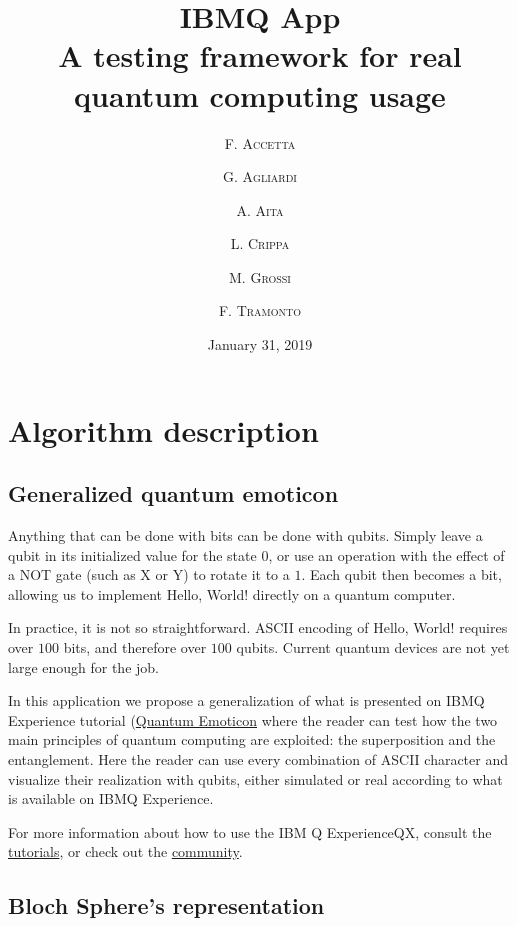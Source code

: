 \documentclass[twoside,twocolumn]{article}
\title{IBMQ App\\A testing framework for real quantum computing usage} %
\author{%
\textsc{F. Accetta} \and \textsc{G. Agliardi} \and \textsc{A. Aita} \and
\textsc{L. Crippa} \and \textsc{M. Grossi} \and \textsc{F. Tramonto} \\
}
\date{January 31, 2019} %
\begin{document}
\maketitle





\section{Algorithm description}\label{cap:science}


\subsection{Generalized quantum emoticon}
Anything that can be done with bits can be done with qubits. Simply leave a qubit in its initialized value for the state $0$, or use an operation with the effect of a NOT gate (such as X or Y) to rotate it to a $1$. Each qubit then becomes a bit, allowing us to implement Hello, World! directly on a quantum computer.

In practice, it is not so straightforward. ASCII encoding of Hello, World! requires over $100$ bits, and therefore over $100$ qubits. Current quantum devices are not yet large enough for the job.

In this application we propose a generalization of what is presented on IBMQ Experience tutorial (\href{
https://github.com/Qiskit/qiskit-tutorials/blob/master/community/hello_world/quantum_emoticon.ipynb
}{Quantum Emoticon} where the reader can test how the two main principles of quantum computing are exploited: the superposition and the entanglement. Here the reader can use every combination of ASCII character and visualize their realization with qubits, either simulated or real according to what is available on IBMQ Experience.


For more information about how to use the IBM Q ExperienceQX, consult the \href{https://quantumexperience.ng.bluemix.net/qstage/#/tutorial?sectionId=c59b3710b928891a1420190148a72cce&pageIndex=0}{tutorials}, or check out the \href{https://quantumexperience.ng.bluemix.net/qstage/#/community}{community}.

\subsection{Bloch Sphere's representation}
\end{document}
